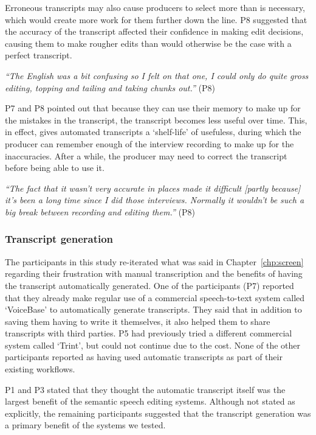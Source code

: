 

Erroneous transcripts may also cause producers to select more than is necessary, which would create more work for them
further down the line. P8 suggested that the accuracy of the transcript affected their confidence in making edit
decisions, causing them to make rougher edits than would otherwise be the case with a perfect transcript.

\textit{``The English was a bit confusing so I felt on that one, I could only do quite gross editing, topping and
tailing and taking chunks out.''} (P8)

P7 and P8 pointed out that because they can use their memory to make up for the mistakes in the transcript,
the transcript becomes less useful over time. This, in effect, gives automated transcripts a `shelf-life' of usefuless,
during which the producer can remember enough of the interview recording to make up for the inaccuracies. After a
while, the producer may need to correct the transcript before being able to use it.

\textit{``The fact that it wasn't very accurate in places made it difficult [partly because] it's been a long time
since I did those interviews. Normally it wouldn't be such a big break between recording and editing them.''} (P8)

\subsubsection{Transcript generation}

The participants in this study re-iterated what was said in Chapter~\ref{chp:screen} regarding their frustration with
manual transcription and the benefits of having the transcript automatically generated.  One of the participants (P7)
reported that they already make regular use of a commercial speech-to-text system called `VoiceBase' to automatically
generate transcripts. They said that in addition to saving them having to write it themselves, it also helped them to
share transcripts with third parties. P5 had previously tried a different commercial system called `Trint', but could
not continue due to the cost. None of the other participants reported as having used automatic transcripts as part of
their existing workflows.

P1 and P3 stated that they thought the automatic transcript itself was the largest benefit of the semantic speech
editing systems.  Although not stated as explicitly, the remaining participants suggested that the transcript
generation was a primary benefit of the systems we tested.

